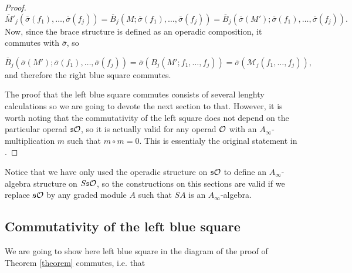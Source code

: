 \documentclass[twoside]{article}
\begin{document}
\begin{proof}
 \[\overline{M}'_j(\overline{\sigma}(f_1),\dots,\overline{\sigma}(f_j))=\overline{B}_j(M;\overline{\sigma}(f_1),\dots,\overline{\sigma}(f_j))=\overline{B}_j(\overline{\sigma}(M');\overline{\sigma}(f_1),\dots,\overline{\sigma}(f_j)).\]
 Now, since the brace structure is defined as an operadic composition, it commutes with $\overline{\sigma}$, so
 
 \[\overline{B}_j(\overline{\sigma}(M');\overline{\sigma}(f_1),\dots,\overline{\sigma}(f_j))=\overline{\sigma}(B_j(M';f_1,\dots, f_j))=\overline{\sigma}(\mathcal{M}_j(f_1,\dots, f_j)),\]
 and therefore the right blue square commutes.
 
 The proof that the left blue square commutes consists of several lenghty calculations so we are going to devote the next section to that. However, it is worth noting that the commutativity of the left square does not depend on the particular operad $\mathfrak{s}{\mathcal O}$, so it is actually valid for any operad ${\mathcal O}$ with an $A_\infty$-multiplication $m$ such that $m\circ m=0$. This is essentialy the original statement in \cite{GV}.
\end{proof}


\begin{remark}
Notice that we have only used the operadic structure on $\mathfrak{s}{\mathcal O}$ to define an $A_\infty$-algebra structure on $S\mathfrak{s}{\mathcal O}$, so the constructions on this sections are valid if we replace $\mathfrak{s}{\mathcal O}$ by any graded module $A$ such that $SA$ is an $A_\infty$-algebra. 
\end{remark}
\subsection{Commutativity of the left blue square}
We are going to show here left blue square in the diagram of the proof of Theorem \ref{theorem} commutes, i.e. that 
\end{document}
